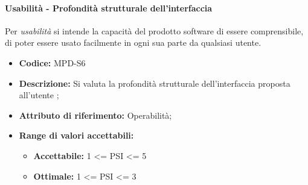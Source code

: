 \paragraph{Usabilità - Profondità strutturale dell'interfaccia}
Per \textit{usabilità} si intende la capacità del prodotto software di essere comprensibile, di poter essere usato facilmente in ogni sua parte da qualsiasi utente.

\begin{itemize}
    \item \textbf{Codice:} MPD-S6
    \item \textbf{Descrizione:} Si valuta la profondità strutturale dell'interfaccia proposta all'utente ;
    \item \textbf{Attributo di riferimento:} Operabilità;
    \item \textbf{Range di valori accettabili:} 
     \begin{itemize}
        \item \textbf{Accettabile:} 1 <= PSI <= 5 
        \item \textbf{Ottimale:} 1 <= PSI <= 3
        
    \end{itemize}
\end{itemize}

